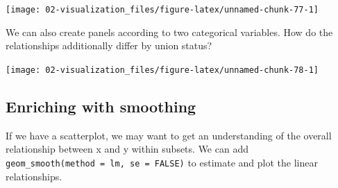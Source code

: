 \documentclass[
]{book}
\newenvironment{Shaded}{\begin{snugshade}}{\end{snugshade}}
\newcommand{\DataTypeTok}[1]{\textcolor[rgb]{0.13,0.29,0.53}{#1}}
\newcommand{\DecValTok}[1]{\textcolor[rgb]{0.00,0.00,0.81}{#1}}
\newcommand{\KeywordTok}[1]{\textcolor[rgb]{0.13,0.29,0.53}{\textbf{#1}}}
\newcommand{\NormalTok}[1]{#1}
\newcommand{\OperatorTok}[1]{\textcolor[rgb]{0.81,0.36,0.00}{\textbf{#1}}}
\newcommand{\StringTok}[1]{\textcolor[rgb]{0.31,0.60,0.02}{#1}}
\begin{document}
\begin{center}\texttt{[image: 02-visualization\_files/figure-latex/unnamed-chunk-77-1]} \end{center}

We can also create panels according to two categorical variables. How do the relationships additionally differ by union status?

\begin{Shaded}
\end{Shaded}

\begin{center}\texttt{[image: 02-visualization\_files/figure-latex/unnamed-chunk-78-1]} \end{center}

\hypertarget{enriching-with-smoothing}{%
\subsection{Enriching with smoothing}\label{enriching-with-smoothing}}

If we have a scatterplot, we may want to get an understanding of the overall relationship between x and y within subsets. We can add \texttt{geom\_smooth(method\ =\ \textquotesingle{}lm\textquotesingle{},\ se\ =\ FALSE)} to estimate and plot the linear relationships.
\end{document}
